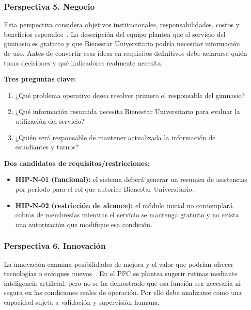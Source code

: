 \subsubsection{Perspectiva 5. Negocio}
Esta perspectiva considera objetivos institucionales, responsabilidades, costos y beneficios esperados~\cite{pohl2025}. La descripción del equipo plantea que el servicio del gimnasio es gratuito y que Bienestar Universitario podría necesitar información de uso. Antes de convertir esas ideas en requisitos definitivos debe aclararse quién toma decisiones y qué indicadores realmente necesita.

\textbf{Tres preguntas clave:}
\begin{enumerate}
\item ¿Qué problema operativo desea resolver primero el responsable del gimnasio?
\item ¿Qué información resumida necesita Bienestar Universitario para evaluar la utilización del servicio?
\item ¿Quién será responsable de mantener actualizada la información de estudiantes y turnos?
\end{enumerate}
\textbf{Dos candidatos de requisitos/restricciones:}
\begin{itemize}
\item \textbf{HIP-N-01 (funcional):} el sistema deberá generar un resumen de asistencias por período para el rol que autorice Bienestar Universitario.
\item \textbf{HIP-N-02 (restricción de alcance):} el módulo inicial no contemplará cobros de membresías mientras el servicio se mantenga gratuito y no exista una autorización que modifique esa condición.
\end{itemize}

\subsubsection{Perspectiva 6. Innovación}
La innovación examina posibilidades de mejora y el valor que podrían ofrecer tecnologías o enfoques nuevos~\cite{pohl2025}. En el PFC se plantea sugerir rutinas mediante inteligencia artificial, pero no se ha demostrado que esa función sea necesaria ni segura en las condiciones reales de operación. Por ello debe analizarse como una capacidad sujeta a validación y supervisión humana.

